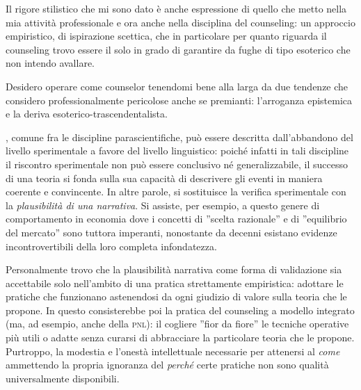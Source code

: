 Il rigore stilistico che mi sono dato è anche espressione di quello che metto nella mia attività professionale e ora anche nella disciplina del counseling: un approccio empiristico, di ispirazione scettica, che in particolare per quanto riguarda il counseling trovo essere il solo in grado di garantire da fughe di tipo esoterico che non intendo avallare.

Desidero operare come counselor tenendomi bene alla larga da due tendenze che considero professionalmente pericolose anche se premianti: l'arroganza epistemica e la deriva esoterico-trascendentalista.

, %
%
comune fra le discipline parascientifiche, può essere descritta dall'abbandono del livello sperimentale a favore del livello linguistico: poiché infatti in tali discipline il riscontro sperimentale non può essere conclusivo né generalizzabile, il successo di una teoria si fonda sulla sua capacità di descrivere gli eventi in maniera coerente e convincente. In altre parole, si sostituisce la verifica sperimentale con la \emph{plausibilità di una narrativa}.
Si assiste, per esempio, a questo genere di comportamento in economia
dove i concetti di ''scelta razionale'' e di ''equilibrio del mercato'' sono tuttora imperanti, nonostante da decenni esistano evidenze incontrovertibili della loro completa infondatezza.

Personalmente trovo che la plausibilità narrativa  come forma di validazione sia accettabile solo nell'ambito di una pratica strettamente empiristica: adottare le pratiche che funzionano astenendosi da ogni giudizio di valore sulla teoria che le propone.
In questo consisterebbe poi la pratica del counseling a modello integrato (ma, ad esempio, anche della \textsc{pnl}): il cogliere ''fior da fiore'' le tecniche operative più utili o adatte senza curarsi di abbracciare la particolare teoria che le propone. Purtroppo, la modestia e l'onestà intellettuale necessarie per attenersi al \emph{come} ammettendo la propria ignoranza del \emph{perché} certe pratiche non sono qualità universalmente disponibili.

